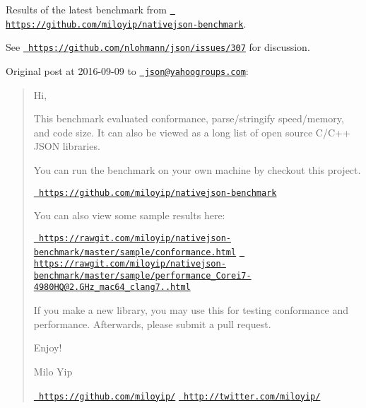 Results of the latest benchmark from \href{https://github.com/miloyip/nativejson-benchmark}{\texttt{ https\+://github.\+com/miloyip/nativejson-\/benchmark}}.

See \href{https://github.com/nlohmann/json/issues/307}{\texttt{ https\+://github.\+com/nlohmann/json/issues/307}} for discussion.

Original post at 2016-\/09-\/09 to \href{mailto:json@yahoogroups.com}{\texttt{ json@yahoogroups.\+com}}\+:

\begin{quote}
Hi,

This benchmark evaluated conformance, parse/stringify speed/memory, and code size. It can also be viewed as a long list of open source C/\+C++ J\+S\+ON libraries.

You can run the benchmark on your own machine by checkout this project.

\href{https://github.com/miloyip/nativejson-benchmark}{\texttt{ https\+://github.\+com/miloyip/nativejson-\/benchmark}}

You can also view some sample results here\+:

\href{https://rawgit.com/miloyip/nativejson-benchmark/master/sample/conformance.html}{\texttt{ https\+://rawgit.\+com/miloyip/nativejson-\/benchmark/master/sample/conformance.\+html}} \href{https://rawgit.com/miloyip/nativejson-benchmark/master/sample/performance_Corei7-4980HQ@2.80GHz_mac64_clang7.0.html}{\texttt{ https\+://rawgit.\+com/miloyip/nativejson-\/benchmark/master/sample/performance\+\_\+\+Corei7-\/4980\+H\+Q@2.\+G\+Hz\+\_\+mac64\+\_\+clang7..\+html}}

If you make a new library, you may use this for testing conformance and performance. Afterwards, please submit a pull request.

Enjoy!

\DoxyHorRuler
 Milo Yip

\href{https://github.com/miloyip/}{\texttt{ https\+://github.\+com/miloyip/}} \href{http://twitter.com/miloyip/}{\texttt{ http\+://twitter.\+com/miloyip/}} \end{quote}

